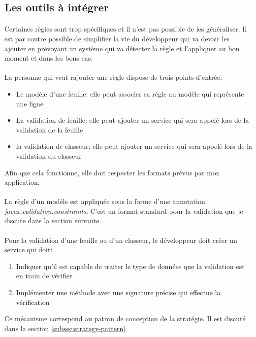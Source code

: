 \subsection{Les outils à intégrer}
\label{subsec:host-tools}

\paragraph{}
Certaines règles sont trop spécifiques et il n'est pas possible de les généraliser.
Il est par contre possible de simplifier la vie du développeur qui va devoir les ajouter en prévoyant un système qui va détecter la règle et l'appliquer au bon moment et dans les bons cas.

\paragraph{}
La personne qui veut rajouter une règle dispose de trois points d'entrée:
\begin{itemize}
    \item Le modèle d'une feuille: elle peut associer sa règle au modèle qui représente une ligne
    \item La validation de feuille: elle peut ajouter un service qui sera appelé lors de la validation de la feuille
    \item la validation de classeur: elle peut ajouter un service qui sera appelé lors de la validation du classeur
\end{itemize}
Afin que cela fonctionne, elle doit respecter les formats prévus par mon application.

\paragraph{}
La règle d'un modèle est appliquée sous la forme d'une annotation \textit{javax.validation.constraints}.
C'est un format standard pour la validation que je discute dans la section suivante.

\paragraph{}
Pour la validation d'une feuille ou d'un classeur, le développeur doit créer un service qui doit:
\begin{enumerate}
    \item Indiquer qu'il est capable de traiter le type de données que la validation est en train de vérifier
    \item Implémenter une méthode avec une signature précise qui effectue la vérification
\end{enumerate}
Ce mécanisme correspond au patron de conception de la stratégie.
Il est discuté dans la section \ref{subsec:strategy-pattern}.
